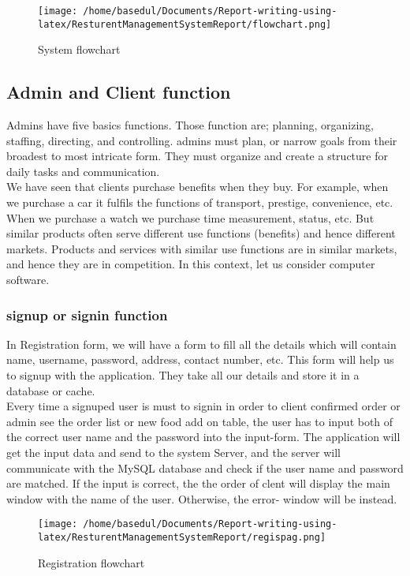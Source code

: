 \documentclass[12pt,a4paper]{article}
\newcommand\tab[1][1cm]{\hspace*{#1}}
\begin{document}
		\begin{figure}[H]
		\centering
		\texttt{[image: /home/basedul/Documents/Report-writing-using-latex/ResturentManagementSystemReport/flowchart.png]}
		\caption{System flowchart}
		\label{fig:flowchart} 
	\end{figure}
	\subsection{Admin and Client function}
	\tab Admins have five basics functions. Those function are; planning, organizing, staffing, directing, and controlling. admins must plan, or narrow goals from their broadest to most intricate form. They must organize and create a structure for daily tasks and communication.\\
We have seen that clients purchase benefits when they buy. For example, when we purchase a car it fulfils the functions of transport, prestige, convenience, etc. When we purchase a watch we purchase time measurement, status, etc. But similar products often serve different use functions (benefits) and hence different markets. Products and services with similar use functions are in similar markets, and hence they are in competition. In this context, let us consider computer software.
	\subsubsection{signup or signin function}
	\tab In Registration form, we will have a form to fill all the details which will contain name, username, password, address, contact number, etc. This form will help us to signup with the application. They take all our details and store it in a database or cache.
\\Every time a signuped user is must to signin in order to client confirmed order or admin see the order list or new food add on table, the
user has to input both of the correct user name and the password into the input-form. The
application will get the input data and send to the system Server, and the server will
communicate with the MySQL database and check if the user name and password are	matched. If the input is correct, the the order of clent will display the main window with the
name of the user. Otherwise, the error-
window will be instead.
		\begin{figure}[H]
		\centering
		\texttt{[image: /home/basedul/Documents/Report-writing-using-latex/ResturentManagementSystemReport/regispag.png]}
		\caption{Registration flowchart}
		\label{fig:regiflow} 
		\end{figure}
	\newpage
\end{document}
